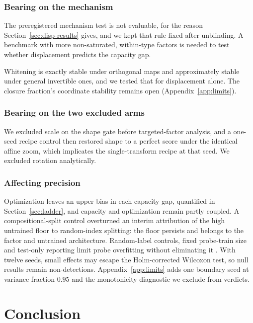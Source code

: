 \documentclass[10pt]{article}
\begin{document}
\subsubsection*{Bearing on the mechanism}

The preregistered mechanism test is not evaluable, for the reason
Section~\ref{sec:disp-results} gives, and we kept that rule fixed after unblinding. A benchmark with
more non-saturated, within-type factors is needed to test whether displacement predicts the capacity
gap.

Whitening is exactly stable under orthogonal maps and approximately stable under general invertible
ones, and we tested that for displacement alone. The closure fraction's coordinate stability remains
open (Appendix~\ref{app:limits}).

\subsubsection*{Bearing on the two excluded arms}
We excluded scale on the shape gate before targeted-factor analysis, and a one-seed recipe control
then restored shape to a perfect score under the identical affine zoom, which implicates the
single-transform recipe at that seed. We excluded rotation analytically.

\subsubsection*{Affecting precision}

Optimization leaves an upper bias in each capacity gap, quantified in
Section~\ref{sec:ladder}, and capacity and optimization remain partly coupled. A compositional-split
control overturned an interim attribution of the high untrained floor to random-index splitting: the
floor persists and belongs to the factor and untrained architecture. Random-label controls, fixed
probe-train size and test-only reporting limit probe overfitting without eliminating it
\citep{belinkov2022probing}. With twelve seeds, small effects may escape the Holm-corrected Wilcoxon
test, so null results remain non-detections. Appendix~\ref{app:limits} adds one boundary seed at
variance fraction $0.95$ and the monotonicity diagnostic we exclude from verdicts.

\section{Conclusion}
\label{sec:conclusion}
\end{document}
